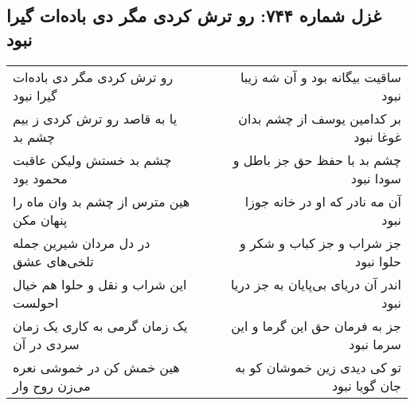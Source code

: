 \begin{center}
\section*{غزل شماره ۷۴۴: رو ترش کردی مگر دی باده‌ات گیرا نبود}
\label{sec:0744}
\begin{longtable}{l p{0.5cm} r}
رو ترش کردی مگر دی باده‌ات گیرا نبود
&&
ساقیت بیگانه بود و آن شه زیبا نبود
\\
یا به قاصد رو ترش کردی ز بیم چشم بد
&&
بر کدامین یوسف از چشم بدان غوغا نبود
\\
چشم بد خستش ولیکن عاقبت محمود بود
&&
چشم بد با حفظ حق جز باطل و سودا نبود
\\
هین مترس از چشم بد وان ماه را پنهان مکن
&&
آن مه نادر که او در خانه جوزا نبود
\\
در دل مردان شیرین جمله تلخی‌های عشق
&&
جز شراب و جز کباب و شکر و حلوا نبود
\\
این شراب و نقل و حلوا هم خیال احولست
&&
اندر آن دریای بی‌پایان به جز دریا نبود
\\
یک زمان گرمی به کاری یک زمان سردی در آن
&&
جز به فرمان حق این گرما و این سرما نبود
\\
هین خمش کن در خموشی نعره می‌زن روح وار
&&
تو کی دیدی زین خموشان کو به جان گویا نبود
\\
\end{longtable}
\end{center}
